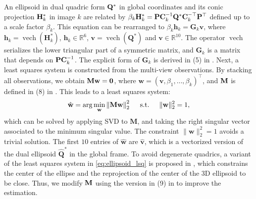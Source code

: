 An ellipsoid in dual quadric form $\mathbf{Q}^*$ in global coordinates and its conic projection $\mathbf{H}_k^*$ in image $k$ are related by $\beta_{k} \mathbf{H}_{k}^*=\mathbf{P} \mathbf{C}_k^{-1} \mathbf{Q}^* \mathbf{C}_k^{-\top} \mathbf{P}^{\top}$ defined up to a scale factor $\beta_{k}$. This equation can be rearranged to $\beta_{k} \mathbf{h}_{k} = \mathbf{G}_k\mathbf{v}$, where $\mathbf{h}_{k} = \operatorname{vech}(\mathbf{H}_{k}^*)$, $\mathbf{h}_{k} \in \mathbb{R}^6$, $\mathbf{v} = \operatorname{vech}(\mathbf{Q}^*)$ and $\mathbf{v} \in \mathbb{R}^{10}$. The operator $\operatorname{vech}$ serializes the lower triangular part of a symmetric matrix, and $\mathbf{G}_k$ is a matrix that depends on $\mathbf{P} \mathbf{C}_k^{-1}$. The explicit form of $\mathbf{G}_k$ is derived in (5) in \cite{rubino20173d}. 
Next, a least squares system is constructed from the multi-view observations. By stacking all observations, we obtain $\mathbf{M} \mathbf{w} = \bf0$, where $\mathbf{w} = (\mathbf{v}, \beta_1,\ldots,\beta_k)^\top$, and $\mathbf{M}$ is defined in (8) in  \cite{rubino20173d}.  
This leads to a least squares system:
%
\begin{equation}
\label{eq:ellipsoid_lsq}
\hat{\mathbf{w}}=\arg \min _{\mathbf{w}}\left\|\mathbf{M} \mathbf{w}\right\|_{2}^{2} \quad \text { s.t. } \quad\|\mathbf{w}\|_{2}^{2}=1,
\end{equation}
%
which can be solved by applying SVD to $\mathbf{M}$, and taking the right singular vector associated to the minimum singular value. The constraint $\|\mathbf{w}\|_{2}^{2}=1$ avoids a trivial solution. The first $10$ entries of $\hat{\mathbf{w}}$ are $\hat{\mathbf{v}}$, which is a vectorized version of the dual ellipsoid $\hat{\mathbf{Q}}^*$ in the global frame. To avoid degenerate quadrics, a variant of the least squares system in \eqref{eq:ellipsoid_lsq} is proposed in \cite{gay2018visual}, which constrains the center of the ellipse and the reprojection of the center of the 3D ellipsoid to be close. Thus, we modify $\mathbf{M}$ using the version in (9) in \cite{gay2018visual} to improve the estimation.

